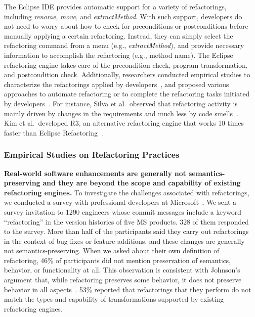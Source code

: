\documentclass[runningheads,a4paper]{llncs}
\begin{document}
The Eclipse IDE provides automatic support for a variety of refactorings, including \emph{rename}, \emph{move}, and \emph{extractMethod}. With such support, developers do not need to worry about how to check for preconditions or postconditions before manually applying a certain refactoring. Instead, they can simply select the refactoring command from a menu (e.g., \emph{extractMethod}), and provide necessary information to accomplish the refactoring (e.g., method name). The Eclipse refactoring engine takes care of the precondition check, program transformation, and postcondition check. Additionally, 
researchers conducted empirical studies to characterize the refactorings applied by developers~\cite{Kim2012:FSR,Murphy-Hill2012:refactor,Vailian2012:misuse,Silva2016:WWR}, and proposed various approaches to automate refactoring or to complete the refactoring tasks initiated by developers~\cite{Griswold:1992,Balazinska1999,Dig:2009,Ge:2012,Chen:2013,Lee:2013,Tsantalis2013:icsm,Meng:2015,Kim:2016}. For instance, Silva et al.~observed that refactoring activity is mainly driven by changes in the requirements and much less by code smells~\cite{Silva2016:WWR}. Kim et al.~developed R3, an alternative refactoring engine that works 10 times faster than Eclipse Refactoring~\cite{Kim:2016}. 

\subsubsection{Empirical Studies on Refactoring Practices} 

{\bf Real-world software enhancements are generally not semantics-preserving and they are beyond the scope and capability of existing refactoring engines.} To investigate the challenges associated with refactorings, we conducted a survey with professional developers at Microsoft~\cite{Kim2012:fieldrefactoring}. We sent a survey invitation to 1290 engineers whose commit messages include a keyword ``refactoring'' in the version histories of five MS products. 328 of them responded to the survey. More than half of the participants said they carry out refactorings in the context of bug fixes or feature additions, and these changes are generally not semantics-preserving. When we asked about their own definition of refactoring, 46\% of participants did not mention preservation of semantics, behavior, or functionality at all. This observation is consistent with Johnson's argument that, while refactoring preserves some behavior, it does not preserve behavior in all aspects~\cite{Johnson2011}. 53\% reported that refactorings that they perform do not match the types and capability of transformations supported by existing refactoring engines. 
\end{document}
